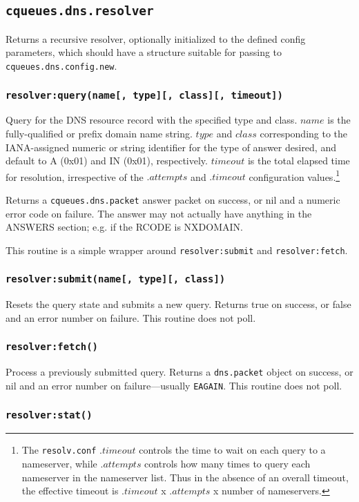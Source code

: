 \documentclass[11pt, oneside]{memoir}
\newcommand*{\fn}[1]{\texttt{#1}\xspace}
\newcommand*{\module}[1]{\texttt{#1}\xspace}
\newcounter{toccols}
\newenvironment{Module}[1]{
	\subsection{\texttt{#1}}
	\addtocontents{toc}{
		\protect\begin{multicols}{\value{toccols}}
	}
}{
	\addtocontents{toc}{\protect\end{multicols}}
}
\begin{document}
\begin{Module}{cqueues.dns.resolver}
Returns a recursive resolver, optionally initialized to the defined config parameters, which should have a structure suitable for passing to \fn{cqueues.dns.config.new}.

\subsubsection[\fn{resolver:query}]{\fn{resolver:query(name[, type][, class][, timeout])}}

Query for the DNS resource record with the specified type and class. $name$ is the fully-qualified or prefix domain name string. $type$ and $class$ corresponding to the IANA-assigned numeric or string identifier for the type of answer desired, and default to A (0x01) and IN (0x01), respectively. $timeout$ is the total elapsed time for resolution, irrespective of the $.attempts$ and $.timeout$ configuration values.\footnote{The \texttt{resolv.conf} $.timeout$ controls the time to wait on each query to a nameserver, while $.attempts$ controls how many times to query each nameserver in the nameserver list. Thus in the absence of an overall timeout, the effective timeout is $.timeout$ x $.attempts$ x number of nameservers.}

Returns a \module{cqueues.dns.packet} answer packet on success, or nil and a numeric error code on failure. The answer may not actually have anything in the ANSWERS section; e.g. if the RCODE is NXDOMAIN.

This routine is a simple wrapper around \fn{resolver:submit} and \fn{resolver:fetch}.

\subsubsection[\fn{resolver:submit}]{\fn{resolver:submit(name[, type][, class])}}

Resets the query state and submits a new query. Returns true on success, or false and an error number on failure. This routine does not poll.

\subsubsection[\fn{resolver:fetch}]{\fn{resolver:fetch()}}

Process a previously submitted query. Returns a \module{dns.packet} object on success, or nil and an error number on failure---usually \texttt{EAGAIN}. This routine does not poll.

\subsubsection[\fn{resolver:stat}]{\fn{resolver:stat()}}


\end{Module}
\end{document}
